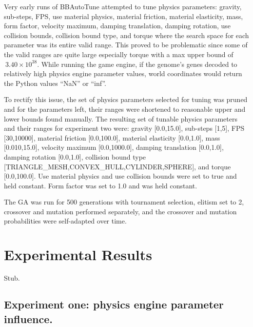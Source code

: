 Very early runs of BBAutoTune attempted to tune physics parameters: gravity, sub-steps, FPS, use material physics, material friction, material elasticity, mass, form factor, velocity maximum, damping translation, damping rotation, use collision bounds, collision bound type, and torque where the search space for each parameter was its entire valid range. This proved to be problematic since some of the valid ranges are quite large especially torque with a max upper bound of $~3.40\times10^{38}$. While running the game engine, if the genome's genes decoded to relatively high physics engine parameter values, world coordinates would return the Python values ``NaN'' or ``inf''.

To rectify this issue, the set of physics parameters selected for tuning was pruned and for the parameters left, their ranges were shortened to reasonable upper and lower bounds found manually. The resulting set of tunable physics parameters and their ranges for experiment two were: gravity [0.0,15.0], sub-steps [1,5], FPS [30,10000], material friction [0.0,100.0], material elasticity [0.0,1.0], mass [0.010,15.0], velocity maximum [0.0,1000.0], damping translation [0.0,1.0], damping rotation [0.0,1.0], collision bound type [TRIANGLE\_MESH,CONVEX\_HULL,CYLINDER,SPHERE], and torque [0.0,100.0]. Use material physics and use collision bounds were set to true and held constant. Form factor was set to 1.0 and was held constant. 

The GA was run for 500 generations with tournament selection, elitism set to 2, crossover and mutation performed separately, and the crossover and mutation probabilities were self-adapted over time.

\section{Experimental Results}

Stub.

\subsection[Experiment One]{Experiment one: physics engine parameter influence.}

